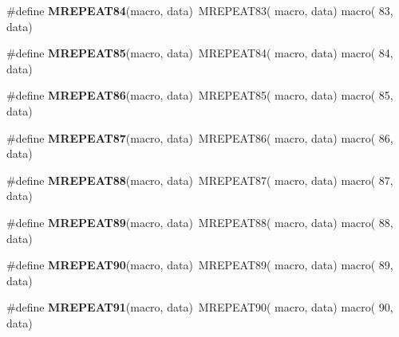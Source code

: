 \begin{DoxyCompactItemize}
\item 
\hypertarget{group__group__sam0__utils__mrepeat_ga8892fab4572ce20132d8237a4fea0f3e}{}\#define {\bfseries M\+R\+E\+P\+E\+A\+T84}(macro,  data)~M\+R\+E\+P\+E\+A\+T83( macro, data)   macro( 83, data)\label{group__group__sam0__utils__mrepeat_ga8892fab4572ce20132d8237a4fea0f3e}

\item 
\hypertarget{group__group__sam0__utils__mrepeat_gac310966754e3b2f99d3bc542eabbcd32}{}\#define {\bfseries M\+R\+E\+P\+E\+A\+T85}(macro,  data)~M\+R\+E\+P\+E\+A\+T84( macro, data)   macro( 84, data)\label{group__group__sam0__utils__mrepeat_gac310966754e3b2f99d3bc542eabbcd32}

\item 
\hypertarget{group__group__sam0__utils__mrepeat_ga30355c63cfe5a0c1ed9928f24d941206}{}\#define {\bfseries M\+R\+E\+P\+E\+A\+T86}(macro,  data)~M\+R\+E\+P\+E\+A\+T85( macro, data)   macro( 85, data)\label{group__group__sam0__utils__mrepeat_ga30355c63cfe5a0c1ed9928f24d941206}

\item 
\hypertarget{group__group__sam0__utils__mrepeat_gad120b88ef29e4f9b0f9017dc084674af}{}\#define {\bfseries M\+R\+E\+P\+E\+A\+T87}(macro,  data)~M\+R\+E\+P\+E\+A\+T86( macro, data)   macro( 86, data)\label{group__group__sam0__utils__mrepeat_gad120b88ef29e4f9b0f9017dc084674af}

\item 
\hypertarget{group__group__sam0__utils__mrepeat_ga7d45423a28a7d85979fa03dfe7b26fdd}{}\#define {\bfseries M\+R\+E\+P\+E\+A\+T88}(macro,  data)~M\+R\+E\+P\+E\+A\+T87( macro, data)   macro( 87, data)\label{group__group__sam0__utils__mrepeat_ga7d45423a28a7d85979fa03dfe7b26fdd}

\item 
\hypertarget{group__group__sam0__utils__mrepeat_gad01c89babbc1d97120f14f62818112d2}{}\#define {\bfseries M\+R\+E\+P\+E\+A\+T89}(macro,  data)~M\+R\+E\+P\+E\+A\+T88( macro, data)   macro( 88, data)\label{group__group__sam0__utils__mrepeat_gad01c89babbc1d97120f14f62818112d2}

\item 
\hypertarget{group__group__sam0__utils__mrepeat_gae85d4d27c3fbd9b354f04156111d089d}{}\#define {\bfseries M\+R\+E\+P\+E\+A\+T90}(macro,  data)~M\+R\+E\+P\+E\+A\+T89( macro, data)   macro( 89, data)\label{group__group__sam0__utils__mrepeat_gae85d4d27c3fbd9b354f04156111d089d}

\item 
\hypertarget{group__group__sam0__utils__mrepeat_ga34182f160702d4e1b896298efc7eaaac}{}\#define {\bfseries M\+R\+E\+P\+E\+A\+T91}(macro,  data)~M\+R\+E\+P\+E\+A\+T90( macro, data)   macro( 90, data)\label{group__group__sam0__utils__mrepeat_ga34182f160702d4e1b896298efc7eaaac}


\end{DoxyCompactItemize}
